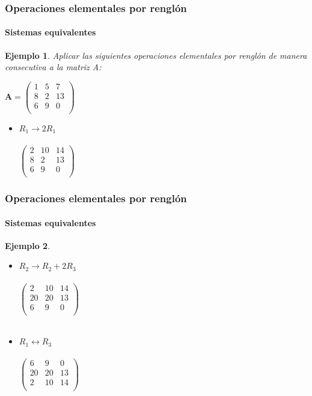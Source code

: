 \documentclass[11pt]{beamer}
\newtheorem{ejem}{Ejemplo}
\begin{document}
\begin{frame}
\frametitle{Operaciones elementales por renglón}
\framesubtitle{Sistemas equivalentes}
\begin{ejem}
Aplicar las siguientes operaciones elementales por renglón de manera consecutiva a la matriz A: \\
\begin{center}
${\displaystyle \mathbf {A} ={\begin{pmatrix}1&5&7\\8&2&13\\6&9&0\\\end{pmatrix}}}$
\end{center}
\begin{itemize}
\item $R_1 \rightarrow 2R_1$ \\ \hspace{0cm} \\
${\displaystyle \mathbf {} {\begin{pmatrix}2&10&14\\8&2&13\\6&9&0\\\end{pmatrix}}}$ 
\end{itemize}
\end{ejem}
\end{frame}

\begin{frame}
\frametitle{Operaciones elementales por renglón}
\framesubtitle{Sistemas equivalentes}
\begin{ejem}
\begin{itemize}
\item $R_2 \rightarrow R_2 + 2R_3$ \\ \hspace{0cm} \\
${\displaystyle \mathbf {} {\begin{pmatrix}2&10&14\\20&20&13\\6&9&0\\\end{pmatrix}}}$\\ \hspace{0cm} \\ 
\item $R_1 \leftrightarrow R_3$ \\ \hspace{0cm} \\
${\displaystyle \mathbf {} {\begin{pmatrix}6&9&0\\20&20&13\\2&10&14\\\end{pmatrix}}}$ 
\end{itemize}
\end{ejem}
\end{frame}
\end{document}

